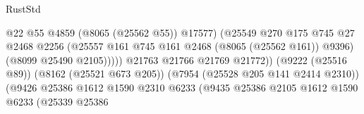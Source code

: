 \begin{lexlean}{RustStd}
\begin{coremodule}
                                                            @22
                                                            @55
                                                            @4859
                                                            (@8065 (@25562 @55))
                                                            @17577)
                                                          (@25549
                                                            @270
                                                            @175
                                                            @745
                                                            @27
                                                            @2468
                                                            @2256
                                                            (@25557
                                                              @161
                                                              @745
                                                              @161
                                                              @2468
                                                              (@8065 (@25562 @161))
                                                              @9396)
                                                            (@8099 @25490 @2105)))))
                                                    @21763
                                                    @21766
                                                    @21769
                                                    @21772))
                                                (@9222 (@25516 @89))
                                                (@8162 (@25521 @673 @205))
                                                (@7954 (@25528 @205 @141 @2414 @2310))
                                                (@9426
                                                  @25386
                                                  @1612
                                                  @1590
                                                  @2310
                                                  @6233
                                                  (@9435
                                                    @25386
                                                    @2105
                                                    @1612
                                                    @1590
                                                    @6233
                                                    (@25339
                                                      @25386

\end{coremodule}
\end{lexlean}
